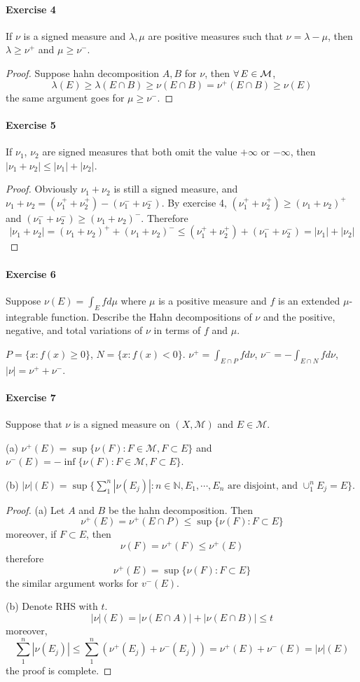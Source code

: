 \paragraph*{Exercise 4}
If $\nu$ is a signed measure and $\lambda,\mu$ are positive measures such that $\nu=\lambda-\mu$, then $\lambda\ge\nu^+$ and $\mu\ge\nu^-$.
\begin{proof}
    Suppose hahn decomposition $A,B$ for $\nu$, then $\forall\, E\in\mathcal{M}$,
    $$
    \lambda(E)\ge\lambda(E\cap B)\ge\nu(E\cap B)=\nu^+(E\cap B)\ge\nu(E)
    $$
    the same argument goes for $\mu\ge\nu^-$.
\end{proof}
\paragraph*{Exercise 5}
If $\nu_1$, $\nu_2$ are signed measures that both omit the value $+\infty$ or $-\infty$, then $|\nu_1+\nu_2|\le|\nu_1|+|\nu_2|$.
\begin{proof}
    Obviously $\nu_1+\nu_2$ is still a signed measure, and $\nu_1+\nu_2=(\nu_1^++\nu_2^+)-(\nu_1^-+\nu_2^-)$. By exercise 4, $(\nu_1^++\nu_2^+)\ge(\nu_1+\nu_2)^+$ and $(\nu_1^-+\nu_2^-)\ge(\nu_1+\nu_2)^-$. Therefore
    $$
    |\nu_1+\nu_2|=(\nu_1+\nu_2)^++(\nu_1+\nu_2)^-\le (\nu_1^++\nu_2^+)+(\nu_1^-+\nu_2^-)=|\nu_1|+|\nu_2|
    $$
\end{proof}
\paragraph*{Exercise 6}
Suppose $\nu(E)=\int_E fd\mu$ where $\mu$ is a positive measure and $f$ is an extended $\mu$-integrable function. Describe the Hahn decompositions of $\nu$ and the positive, negative, and total variations of $\nu$ in terms of $f$ and $\mu$.
\begin{solution}
    $P=\{x:f(x)\ge 0\}$, $N=\{x:f(x)<0\}$. $\nu^+=\int_{E\cap P}fd\nu$, $\nu^-=-\int_{E\cap N}fd\nu$, $|\nu|=\nu^++\nu^-$.
\end{solution}
\paragraph*{Exercise 7}
Suppose that $\nu$ is a signed measure on $(X,\mathcal{M})$ and $E\in\mathcal{M}$.
\par (a) $\nu^+(E)=\sup\{\nu(F):F\in\mathcal{M},F\subset E\}$ and $\nu^-(E)=-\inf\{\nu(F):F\in\mathcal{M},F\subset E\}$.
\par (b) $|\nu|(E)=\sup\{\sum^n_1|\nu(E_j)|:n\in\mathbb{N},\text{$E_1,\cdots,E_n$ are disjoint, and $\cup^n_1E_j=E$}\}$.
\begin{proof}
    (a) Let $A$ and $B$ be the hahn decomposition. Then
    $$
    \nu^+(E)=\nu^+(E\cap P)\le\sup\{\nu(F):F\subset E\}
    $$
    moreover, if $F\subset E$, then
    $$
    \nu(F)=\nu^+(F)\le\nu^+(E)
    $$
    therefore
    $$
    \nu^+(E)=\sup\{\nu(F):F\subset E\}
    $$
    the similar argument works for $v^-(E)$.
    \par (b) Denote RHS with $t$.
    $$
    |\nu|(E)=|\nu(E\cap A)|+|\nu(E\cap B)|\le t
    $$
    moreover, 
    $$
    \sum^n_1|\nu(E_j)|\le\sum^n_1(\nu^+(E_j)+\nu^-(E_j))=\nu^+(E)+\nu^-(E)=|\nu|(E)
    $$
    the proof is complete.
\end{proof}